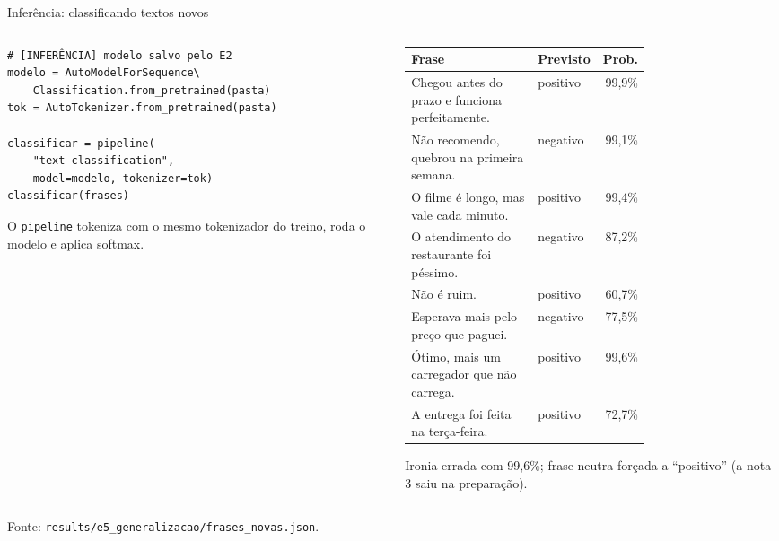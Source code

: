 \documentclass[aspectratio=169,10pt]{beamer}
\newcommand{\fonte}[1]{\par\vfill{\scriptsize\color{tinta2}Fonte: #1}}
\begin{document}
\begin{frame}[fragile]{Inferência: classificando textos novos}
  \begin{columns}[T]
    \begin{column}{0.38\textwidth}
      \begin{lstlisting}[basicstyle=\ttfamily\scriptsize]
# [INFERÊNCIA] modelo salvo pelo E2
modelo = AutoModelForSequence\
    Classification.from_pretrained(pasta)
tok = AutoTokenizer.from_pretrained(pasta)

classificar = pipeline(
    "text-classification",
    model=modelo, tokenizer=tok)
classificar(frases)
      \end{lstlisting}
      \footnotesize O \texttt{pipeline} tokeniza com o \alert{mesmo} tokenizador do treino, roda o modelo e aplica softmax.
    \end{column}
    \begin{column}{0.6\textwidth}
      \scriptsize
      \renewcommand{\arraystretch}{1.15}
      \begin{tabular}{@{}L{0.64\linewidth}lr@{}}
        \toprule
        \textbf{Frase} & \textbf{Previsto} & \textbf{Prob.} \\
        \midrule
        Chegou antes do prazo e funciona perfeitamente. & positivo & 99,9\% \\
        Não recomendo, quebrou na primeira semana. & negativo & 99,1\% \\
        O filme é longo, mas vale cada minuto. & positivo & 99,4\% \\
        O atendimento do restaurante foi péssimo. & negativo & 87,2\% \\
        Não é ruim. & positivo & 60,7\% \\
        Esperava mais pelo preço que paguei. & negativo & 77,5\% \\
        \midrule
        \textcolor{laranja}{Ótimo, mais um carregador que não carrega.} & \textcolor{laranja}{positivo} & \textcolor{laranja}{99,6\%} \\
        \textcolor{laranja}{A entrega foi feita na terça-feira.} & \textcolor{laranja}{positivo} & \textcolor{laranja}{72,7\%} \\
        \bottomrule
      \end{tabular}
      \par\vspace{4pt}
      \small Ironia errada com \alert{99,6\%}; frase neutra forçada a ``positivo'' (a nota 3 saiu na preparação).
    \end{column}
  \end{columns}
  \fonte{\texttt{results/e5\_generalizacao/frases\_novas.json}.}
\end{frame}
\end{document}
